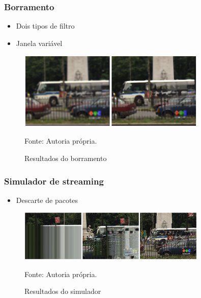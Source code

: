 	\begin{frame}\frametitle{Borramento}
		\begin{itemize}
			\item Dois tipos de filtro
			\item Janela variável
		\end{itemize}

		\begin{figure}
			\includegraphics[width=0.8\textwidth]{./imgs/blur.png}
			\caption{Resultados do borramento}
			\tiny
			Fonte: Autoria própria.
		\end{figure}

    \end{frame}
	
	\begin{frame}\frametitle{Simulador de streaming}
		\begin{itemize}
			\item Descarte de pacotes
		\end{itemize}

		\begin{figure}
			\includegraphics[width=0.8\textwidth]{./imgs/net.png}
			\caption{Resultados do simulador}
			\tiny
			Fonte: Autoria própria.
		\end{figure}

    \end{frame}
		
